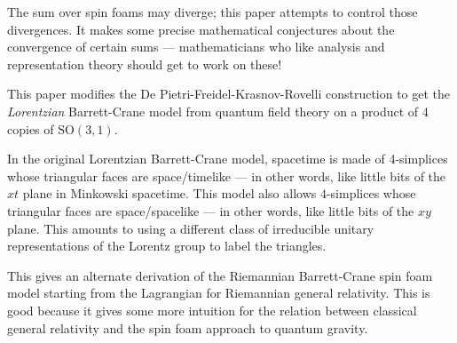 \documentclass{article}
\def\tightlist{}
\renewcommand{\texttt}[1]{%
  \begingroup
  \ttfamily
  \begingroup\lccode`~=`/\lowercase{\endgroup\def~}{/\discretionary{}{}{}}%
  \begingroup\lccode`~=`[\lowercase{\endgroup\def~}{[\discretionary{}{}{}}%
  \begingroup\lccode`~=`.\lowercase{\endgroup\def~}{.\discretionary{}{}{}}%
  \catcode`/=\active\catcode`[=\active\catcode`.=\active
  \scantokens{#1\noexpand}%
  \endgroup
}
\begin{document}
The sum over spin foams may diverge; this paper attempts to control
those divergences. It makes some precise mathematical conjectures about
the convergence of certain sums --- mathematicians who like analysis and
representation theory should get to work on these!


This paper modifies the De Pietri-Freidel-Krasnov-Rovelli construction
to get the \emph{Lorentzian} Barrett-Crane model from quantum field
theory on a product of 4 copies of \(\mathrm{SO}(3,1)\).


In the original Lorentzian Barrett-Crane model, spacetime is made of
4-simplices whose triangular faces are space/timelike --- in other
words, like little bits of the \(xt\) plane in Minkowski spacetime. This
model also allows \(4\)-simplices whose triangular faces are
space/spacelike --- in other words, like little bits of the \(xy\)
plane. This amounts to using a different class of irreducible unitary
representations of the Lorentz group to label the triangles.


This gives an alternate derivation of the Riemannian Barrett-Crane spin
foam model starting from the Lagrangian for Riemannian general
relativity. This is good because it gives some more intuition for the
relation between classical general relativity and the spin foam approach
to quantum gravity.
\end{document}
